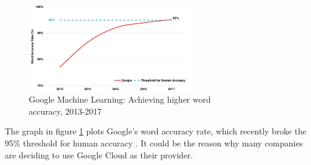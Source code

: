 \documentclass{article}
\begin{document}
{\large
\begin{figure}
  \vspace{-15pt}
  \begin{center}
    \includegraphics[width=0.65\textwidth]{img/googleaccuracy.png}
  \end{center}
  \vspace{-20pt}
  \caption[Google Machine Learning: Achieving Higher Word Accuracy, 2013-2017]
  {Google Machine Learning: Achieving higher word \\ accuracy, 2013-2017\endtabular}
  \label{fig:googleaccuracy}
  \vspace{-10pt}
\end{figure}
The graph in figure \ref{fig:googleaccuracy} plots Google’s word accuracy rate, which recently broke the 95\% threshold for human accuracy \parencite{googlespeechrecognition}. It could be the reason why many companies are deciding to use Google Cloud as their provider.\par
}
\end{document}

